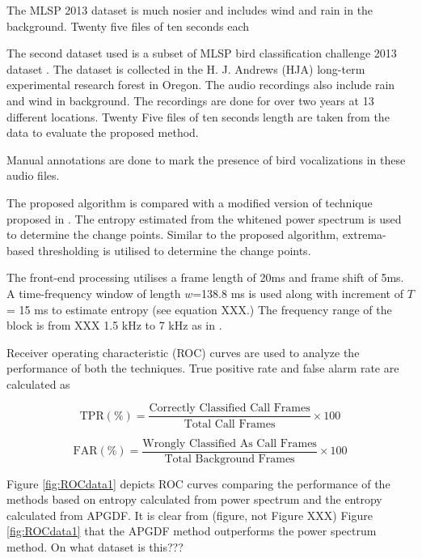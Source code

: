 \documentclass[a4paper]{article}
\begin{document}
The MLSP 2013 dataset \cite{data2} is much nosier and includes wind and rain in
the background. Twenty five files of ten seconds each 

The second dataset used is a subset of MLSP bird classification challenge 2013
dataset \cite{data2}. The dataset is collected in the H. J. Andrews (HJA)
long-term experimental research forest in Oregon. The audio recordings also
include rain and wind in background. The recordings are done for over two years
at 13 different locations. Twenty Five files of ten seconds length are taken
from the data to evaluate the proposed method. 

Manual annotations are done to
mark the presence of bird vocalizations in these audio files.  

The proposed algorithm is compared with a modified version of
technique proposed in \cite{wang2013}. The entropy estimated from the whitened power
spectrum is used to determine the change points. Similar to the proposed
algorithm, extrema-based thresholding is utilised to determine the change
points. 

The front-end processing utilises a frame length of 20ms and frame shift of 5ms.
A time-frequency window of length $w$=138.8 ms is used along with increment of
$T$ = 15 ms to estimate entropy (see equation XXX.) The frequency range of the
block is from XXX 1.5 kHz to 7 kHz
as in \cite{wang2013}. 


Receiver operating characteristic (ROC) curves are used to analyze the
performance of both the techniques. True positive rate and false alarm rate are
calculated as

\begin{equation}
\text{TPR} (\%)=\frac{\text{Correctly Classified Call Frames}} {\text{Total Call Frames}} \times 100 
\end{equation}




\begin{equation}
\text{FAR} (\%)=\frac{\text{Wrongly Classified As Call Frames}} {\text{Total Background Frames}} \times 100 
\end{equation}



 Figure \ref{fig:ROCdata1} depicts ROC curves comparing the performance of 
 the methods based on entropy calculated from power spectrum and the entropy
 calculated from APGDF. It is clear from  (figure, not Figure XXX) Figure \ref{fig:ROCdata1} that the
 APGDF method outperforms the power spectrum method. On what dataset is this???
\end{document}
